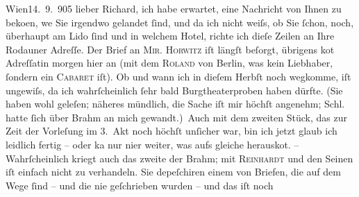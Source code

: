 \begin{ledgroupsized}[t]{13cm}
           \raggedleft{}{\pb}Wien14. 9. 905\pend
           \pstart
           lieber Richard, ich habe erwartet, eine Nachricht von Ihnen zu
                  beko{\geminationm}en, we{\geminationn} Sie
               irgendwo gelandet ſind, und da ich nicht weiſs, ob Sie ſchon, noch, überhaupt am Lido ſind und in welchem Hotel, richte ich dieſe
               Zeilen an Ihre Rodauner Adreſſe. Der Brief an \textsc{Mir. Horwitz} iſt längſt beſorgt, übrigens ko{\geminationm}t Adreſſatin
               morgen hier an (mit dem \textsc{Roland} von Berlin, was kein Liebhaber, ſondern ein
                  \textsc{Caba{\pb}ret} iſt). Ob und
               wann ich in dieſem Herbſt noch wegkomme, iſt ungewiſs, da ich wahrſcheinlich ſehr
               bald Burgtheaterproben haben dürfte. (Sie haben
               wohl geleſen; näheres mündlich, die Sache iſt mir höchſt angenehm; Schl. hatte ſich über Brahm an mich gewandt.) Auch mit dem zweiten Stück, das zur Zeit der Vorleſung im 3. Akt
               noch höchſt unſicher war, bin ich jetzt glaub ich leidlich fertig – oder ka{\geminationn} nur ni{\geminationm}er weiter, was
               aufs gleiche {\pb}herausko{\geminationm}t.
               – Wahrſcheinlich kriegt auch das zweite der Brahm; mit \textsc{Reinhardt} und den Seinen iſt einfach nicht zu verhandeln. Sie depeſchiren einem von
               Briefen, die auf dem Wege ſind – und die nie geſchrieben wurden – und das iſt noch

\end{ledgroupsized}
